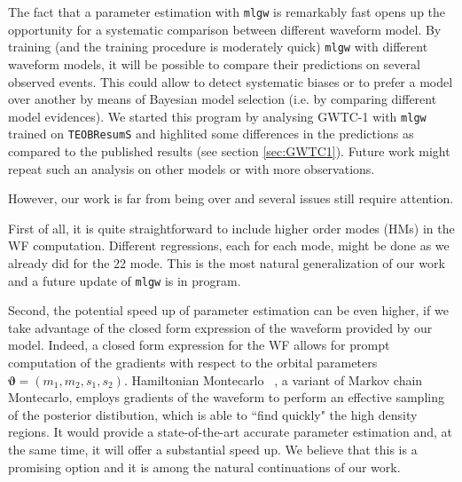 The fact that a parameter estimation with \texttt{mlgw} is remarkably fast opens up the opportunity for a systematic comparison between different waveform model.
By training (and the training procedure is moderately quick) \texttt{mlgw} with different waveform models, it will be possible to compare their predictions on several observed events. This could allow to detect systematic biases or to prefer a model over another by means of Bayesian model selection (i.e. by comparing different model evidences).
We started this program by analysing GWTC-1 with \texttt{mlgw} trained on \texttt{TEOBResumS} and highlited some differences in the predictions as compared to the published results (see section \ref{sec:GWTC1}). Future work might repeat such an analysis on other models or with more observations.
\par
However, our work is far from being over and several issues still require attention.
\par
First of all, it is quite straightforward to include higher order modes (HMs) in the WF computation. Different regressions, each for each mode, might be done as we already did for the 22 mode. This is the most natural generalization of our work and a future update of \texttt{mlgw} is in program.
\par
Second, the potential speed up of parameter estimation can be even higher, if we take advantage of the closed form expression of the waveform provided by our model.
Indeed, a closed form expression for the WF allows for prompt computation of the gradients with respect to the orbital parameters $ \boldsymbol{\vartheta} = (m_1,m_2, {s}_1,{s}_2) $.
Hamiltonian Montecarlo \cite{betancourt2017hamiltonianMC}~\cite{Porter2014Hamiltonian_MonteCarlo}, a variant of Markov chain Montecarlo, employs gradients of the waveform to perform an effective sampling of the posterior distibution, which is able to ``find quickly" the high density regions.
It would provide a state-of-the-art accurate parameter estimation and, at the same time, it will offer a substantial speed up.
We believe that this is a promising option and it is among the natural continuations of our work.
\par
